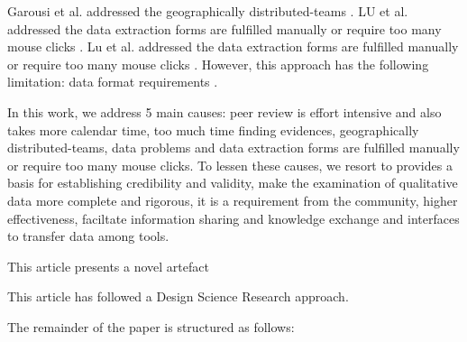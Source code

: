 \documentclass{article}
\begin{document}
Garousi et al. addressed the geographically distributed-teams \cite{Garousi2017}. LU et al. addressed the data extraction forms are fulfilled manually or require too many mouse clicks \cite{LU2008}. Lu et al. addressed the data extraction forms are fulfilled manually or require too many mouse clicks \cite{Lu2008}. However, this approach has the following limitation: data format requirements \cite{Lu2008}. 
    
In this work, we address 5 main causes: peer review is effort intensive and also takes more calendar time, too much time finding evidences, geographically distributed-teams, data problems and data extraction forms are fulfilled manually or require too many mouse clicks. To lessen these causes, we resort to provides a basis for establishing credibility and validity, make the examination of qualitative data more complete and rigorous, it is a requirement from the community, higher effectiveness, faciltate information sharing and knowledge exchange and interfaces to transfer data among tools. 
    
This article presents a novel artefact
    

    

      
This article has followed a Design Science Research approach.

The remainder of the paper is structured as follows: 

    
      


\end{document}
